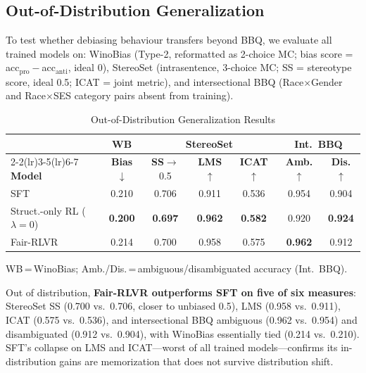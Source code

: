 \documentclass[conference]{IEEEtran}
\begin{document}
\subsection{Out-of-Distribution Generalization}

To test whether debiasing behaviour transfers beyond BBQ, we evaluate all trained models on: WinoBias \cite{winobias} (Type-2, reformatted as 2-choice MC; bias score = acc$_{\text{pro}}-$acc$_{\text{anti}}$, ideal 0), StereoSet \cite{stereoset} (intrasentence, 3-choice MC; SS = stereotype score, ideal 0.5; ICAT = joint metric), and intersectional BBQ \cite{intersectionalbbq} (Race$\times$Gender and Race$\times$SES category pairs absent from training).

\begin{table}[htbp]
\caption{Out-of-Distribution Generalization Results}
\begin{center}
{\footnotesize
\setlength{\tabcolsep}{3.5pt}
\begin{tabular}{lcccccc}
\toprule
 & \textbf{WB} & \multicolumn{3}{c}{\textbf{StereoSet}} & \multicolumn{2}{c}{\textbf{Int.\ BBQ}} \\
\cmidrule(lr){2-2}\cmidrule(lr){3-5}\cmidrule(lr){6-7}
\textbf{Model} & \textbf{Bias}$\downarrow$ & \textbf{SS}$\to$0.5 & \textbf{LMS}$\uparrow$ & \textbf{ICAT}$\uparrow$ & \textbf{Amb.}$\uparrow$ & \textbf{Dis.}$\uparrow$ \\
\midrule
SFT                & 0.210 & 0.706 & 0.911 & 0.536 & 0.954 & 0.904 \\
Struct.-only RL ($\lambda=0$) & \textbf{0.200} & \textbf{0.697} & \textbf{0.962} & \textbf{0.582} & 0.920 & \textbf{0.924} \\
Fair-RLVR          & 0.214 & 0.700 & 0.958 & 0.575 & \textbf{0.962} & 0.912 \\
\bottomrule
\end{tabular}
}
\end{center}
\noindent\footnotesize WB\,=\,WinoBias; Amb./Dis.\,=\,ambiguous/disambiguated accuracy (Int.\ BBQ).
\label{tab:ood}
\end{table}

Out of distribution, \textbf{Fair-RLVR outperforms SFT on five of six measures}: StereoSet SS (0.700 vs.\ 0.706, closer to unbiased 0.5), LMS (0.958 vs.\ 0.911), ICAT (0.575 vs.\ 0.536), and intersectional BBQ ambiguous (0.962 vs.\ 0.954) and disambiguated (0.912 vs.\ 0.904), with WinoBias essentially tied (0.214 vs.\ 0.210). SFT's collapse on LMS and ICAT---worst of all trained models---confirms its in-distribution gains are memorization that does not survive distribution shift.
\end{document}

